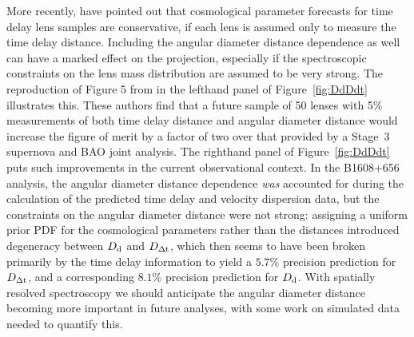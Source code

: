 More recently, \citet{JeeKomatsuSuyu2015} have pointed out that
cosmological parameter forecasts for time delay lens samples are
conservative, if each lens is assumed only to measure the time delay
distance. Including the angular diameter distance dependence as well can
have a marked effect on the projection, especially if the spectroscopic
constraints on the lens mass distribution are assumed to be very strong.
The reproduction of Figure 5 from
\citet{JeeEtal2016} in the lefthand panel of Figure~\ref{fig:DdDdt}
illustrates this. These authors find that a future sample of
50 lenses
with 5\% measurements of both time delay distance and angular diameter
distance would increase the figure of merit by a factor of two over that
provided by a Stage~3 supernova and BAO joint analysis. The righthand
panel of Figure~\ref{fig:DdDdt} puts such improvements in the  current
observational context. In the B1608$+$656 analysis, the  angular
diameter distance dependence {\it was} accounted for during the
calculation of the predicted time delay and velocity dispersion data,
but the constraints on the angular diameter distance were not strong:
assigning a uniform prior PDF for the cosmological parameters rather
than the distances introduced degeneracy between $D_{\rm d}$ and $D_{\Delta{\rm t}}$,
which then seems to have been broken primarily by the time delay
information to yield a $5.7\%$ precision prediction for $D_{\Delta{\rm t}}$, and
a corresponding $8.1\%$ precision prediction for $D_{\rm d}$.
With spatially resolved spectroscopy we should anticipate the angular
diameter distance becoming more important in future analyses, with
some work on simulated data needed to quantify this.


